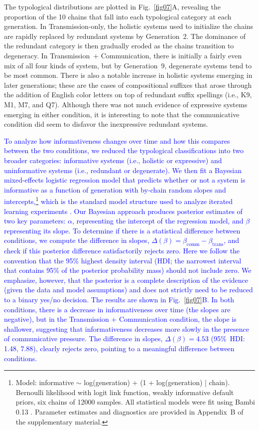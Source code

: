\documentclass[doc,biblatex]{apa7}
\newcommand\newmaterial[1]{\textcolor{blue}{#1}}
\begin{document}
The typological distributions are plotted in Fig.~\ref{fig07}A, revealing the proportion of the 10 chains that fall into each typological category at each generation. In Transmission-only, the holistic systems used to initialize the chains are rapidly replaced by redundant systems by Generation~2. The dominance of the redundant category is then gradually eroded as the chains transition to degeneracy. In Transmission~+ Communication, there is initially a fairly even mix of all four kinds of system, but by Generation~9, degenerate systems tend to be most common. There is also a notable increase in holistic systems emerging in later generations; these are the cases of compositional suffixes that arose through the addition of English color letters on top of redundant suffix spellings (i.e., K9, M1, M7, and Q7). Although there was not much evidence of expressive systems emerging in either condition, it is interesting to note that the communicative condition did seem to disfavor the inexpressive redundant systems.

\newmaterial{To analyze how informativeness changes over time and how this compares between the two conditions, we reduced the typological classifications into two broader categories: informative systems (i.e., holistic or expressive) and uninformative systems (i.e., redundant or degenerate). We then fit a Bayesian mixed-effects logistic regression model that predicts whether or not a system is informative as a function of generation with by-chain random slopes and intercepts,\footnote{Model: informative $\sim$ log(generation) + (1 + log(generation) | chain). Bernoulli likelihood with logit link function, weakly informative default priors, six chains of 12000 samples. All statistical models were fit using Bambi 0.13 \parencite{Capretto:2022}. Parameter estimates and diagnostics are provided in Appendix~B of the supplementary material.} which is the standard model structure used to analyze iterated learning experiments \parencite{Winter:2016}. Our Bayesian approach produces posterior estimates of two key parameters: $\alpha$, representing the intercept of the regression model, and $\beta$ representing its slope. To determine if there is a statistical difference between conditions, we compute the difference in slopes, $\Delta(\beta) = \beta_\mathrm{comm} - \beta_\mathrm{trans}$, and check if this posterior difference satisfactorily rejects zero. Here we follow the convention that the 95\% highest density interval (HDI; the narrowest interval that contains 95\% of the posterior probability mass) should not include zero. We emphasize, however, that the posterior is a complete description of the evidence (given the data and model assumptions) and does not strictly need to be reduced to a binary yes/no decision. The results are shown in Fig.~\ref{fig07}B. In both conditions, there is a decrease in informativeness over time (the slopes are negative), but in the Transmission + Communication condition, the slope is shallower, suggesting that informativeness decreases more slowly in the presence of communicative pressure. The difference in slopes, $\Delta(\beta) = 4.53$ (95\%~HDI: 1.48, 7.88), clearly rejects zero, pointing to a meaningful difference between conditions.}
\end{document}
